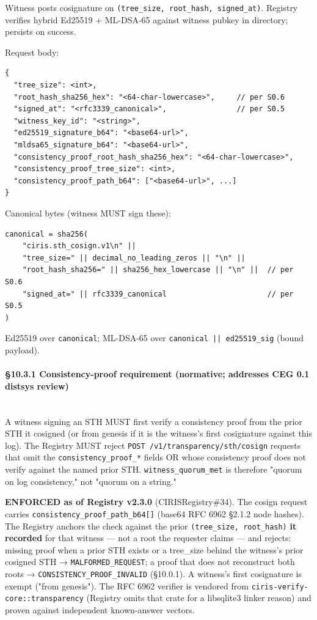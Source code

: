 \documentclass[10pt]{article}
\begin{document}
Witness posts cosignature on \texttt{(tree\_size, root\_hash, signed\_at)}. Registry verifies hybrid Ed25519 + ML-DSA-65 against witness pubkey in directory; persists on success.


Request body:


\begin{lstlisting}
{
  "tree_size": <int>,
  "root_hash_sha256_hex": "<64-char-lowercase>",     // per S0.6
  "signed_at": "<rfc3339_canonical>",                // per S0.5
  "witness_key_id": "<string>",
  "ed25519_signature_b64": "<base64-url>",
  "mldsa65_signature_b64": "<base64-url>",
  "consistency_proof_root_hash_sha256_hex": "<64-char-lowercase>",
  "consistency_proof_tree_size": <int>,
  "consistency_proof_path_b64": ["<base64-url>", ...]
}
\end{lstlisting}

Canonical bytes (witness MUST sign these):


\begin{lstlisting}
canonical = sha256(
    "ciris.sth_cosign.v1\n" ||
    "tree_size=" || decimal_no_leading_zeros || "\n" ||
    "root_hash_sha256=" || sha256_hex_lowercase || "\n" ||  // per S0.6
    "signed_at=" || rfc3339_canonical                       // per S0.5
)
\end{lstlisting}

Ed25519 over \texttt{canonical}; ML-DSA-65 over \texttt{canonical || ed25519\_sig} (bound payload).


\paragraph{§10.3.1 Consistency-proof requirement (normative; addresses CEG 0.1 distsys review)}\mbox{}\\


A witness signing an STH MUST first verify a consistency proof from the prior STH it cosigned (or from genesis if it is the witness's first cosignature against this log). The Registry MUST reject \texttt{POST /v1/transparency/sth/cosign} requests that omit the \texttt{consistency\_proof\_*} fields OR whose consistency proof does not verify against the named prior STH. \texttt{witness\_quorum\_met} is therefore "quorum on log consistency," not "quorum on a string."


\textbf{ENFORCED as of Registry v2.3.0} (CIRISRegistry\#34). The cosign request carries \texttt{consistency\_proof\_path\_b64[]} (base64 RFC 6962 §2.1.2 node hashes). The Registry anchors the check against the prior \texttt{(tree\_size, root\_hash)} \textbf{it recorded} for that witness — not a root the requester claims — and rejects: missing proof when a prior STH exists or a tree\_size behind the witness's prior cosigned STH → \texttt{MALFORMED\_REQUEST}; a proof that does not reconstruct both roots → \texttt{CONSISTENCY\_PROOF\_INVALID} (§10.0.1). A witness's first cosignature is exempt ("from genesis"). The RFC 6962 verifier is vendored from \texttt{ciris-verify-core::transparency} (Registry omits that crate for a libsqlite3 linker reason) and proven against independent known-answer vectors.
\end{document}
